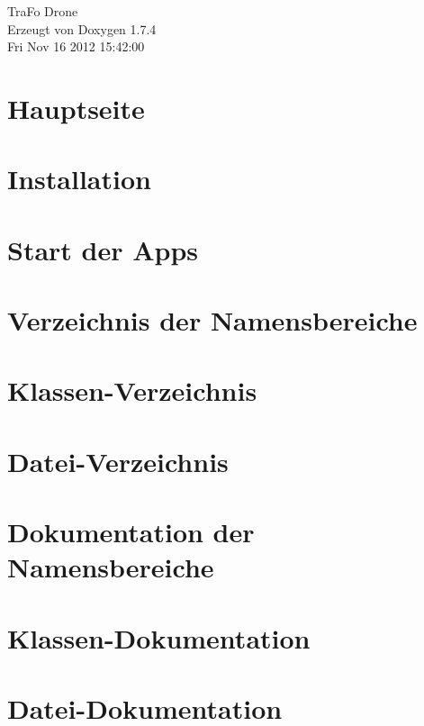\documentclass[a4paper]{book}
\begin{document}
\hypersetup{pageanchor=false}
\begin{titlepage}
\vspace*{7cm}
\begin{center}
{\Large TraFo Drone }\\
\vspace*{1cm}
{\large Erzeugt von Doxygen 1.7.4}\\
\vspace*{0.5cm}
{\small Fri Nov 16 2012 15:42:00}\\
\end{center}
\end{titlepage}
\clearemptydoublepage
{}
\tableofcontents
\clearemptydoublepage
{}
\hypersetup{pageanchor=true}
\chapter{Hauptseite}
\label{index}\hypertarget{index}{}
\chapter{Installation}
\label{page1}
\hypertarget{page1}{}

\chapter{Start der Apps}
\label{page2}
\hypertarget{page2}{}

\chapter{Verzeichnis der Namensbereiche}

\chapter{Klassen-\/Verzeichnis}

\chapter{Datei-\/Verzeichnis}

\chapter{Dokumentation der Namensbereiche}



\chapter{Klassen-\/Dokumentation}


\chapter{Datei-\/Dokumentation}
















\printindex
\end{document}
